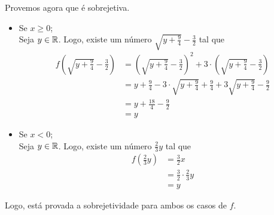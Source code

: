 Provemos agora que é sobrejetiva.
\begin{itemize}
    \item Se $x \ge 0$; \\
    Seja $y \in \mathbb R$. Logo, existe um número $\sqrt{y + \frac{9}{4}} - \frac{3}{2}$ tal que
    \begin{align*}
        f(\sqrt{y + \frac{9}{4}} - \frac{3}{2}) & = (\sqrt{y + \frac{9}{4}} - \frac{3}{2})^2 + 3 \cdot (\sqrt{y + \frac{9}{4}} - \frac{3}{2}) \\ & =
        y + \frac{9}{4} - 3 \cdot \sqrt{y + \frac{9}{4}} + \frac{9}{4} + 3\sqrt{y + \frac{9}{4}} - \frac{9}{2} \\ & =
        y + \frac{18}{4} - \frac{9}{2} \\ & =
        y
    \end{align*}
    \item Se $x < 0$; \\
    Seja $y \in \mathbb R$. Logo, existe um número $\frac{2}{3}y$ tal que
    \begin{align*}
        f(\frac{2}{3}y) & = \frac{3}{2}x \\ &= \frac{3}{2} \cdot \frac{2}{3}y \\ & = y
    \end{align*}
\end{itemize}
Logo, está provada a sobrejetividade para ambos os casos de $f$.